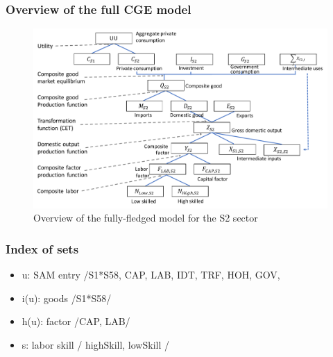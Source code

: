\subsubsection{Overview of the full CGE model}

\begin{figure}[!h]
	\centering
	\includegraphics[width=14cm]{figures/overview_full.pdf}
	\caption{Overview of the fully-fledged model for the S2 sector}
	\label{fig:overview_full}
\end{figure}

\subsubsection{Index of sets}
\begin{itemize}
	\item u: SAM entry     /S1*S58, CAP, LAB, IDT, TRF, HOH, GOV,
	\item i(u): goods         /S1*S58/
	\item h(u): factor        /CAP, LAB/
	\item s: labor skill   / highSkill, lowSkill /
\end{itemize}

